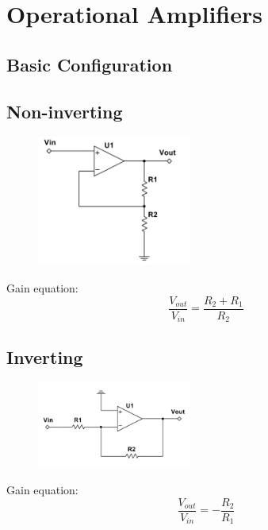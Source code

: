 \chapter{Operational Amplifiers}

\section{Basic Configuration}

\section{Non-inverting}
\begin{figure}[H]
	\centering
	\includegraphics[width=2in]{opamps/noninverting.png}
	\label{fig:fig}
\end{figure}
Gain equation:
\[\frac{V_{out}}{V_{in}} = \frac{R_2 + R_1}{R_2} \]

\section{Inverting}
\begin{figure}[H]
	\centering
	\includegraphics[width=2in]{opamps/inverting.png}
	\label{fig:fig}
\end{figure}
Gain equation:
\[\frac{V_{out}}{V_{in}} = -\frac{R_2}{R_1} \]

